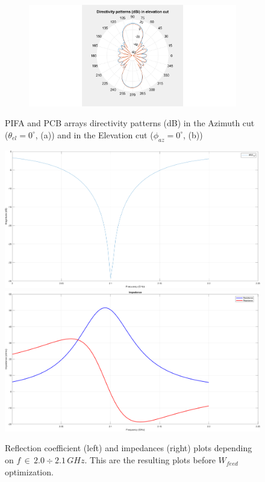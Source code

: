 \documentclass[12pt,a4paper]{article}
\begin{document}
{\begin{figure}[h]
\begin{center}
\begin{subfigure}{0.5\linewidth}
			\includegraphics[scale=0.3]{pifa_pcb_array_elevation_comparison.pdf}
			\caption{}	\end{subfigure}
		\caption{
			PIFA and PCB arrays directivity patterns (dB) in the Azimuth cut  ($\theta_{el}=0^\circ$, (a)) and in the Elevation cut ($\phi_{az}=0^\circ$, (b))}
	\end{center}  
\end{figure}

\begin{center}
	\begin{figure}
		\includegraphics[width = 0.5\linewidth]{gamma.png}
		\includegraphics[width = 0.5\linewidth]{impedances.png}
		\caption{Reflection coefficient (left) and impedances (right) plots depending on $f\,\in\,2.0\div 2.1\,GHz$. This are the resulting plots before $W_{feed}$ optimization. }
	\end{figure}
\end{center}
	\begin{multicols}{2}

\end{multicols}}
\end{document}
